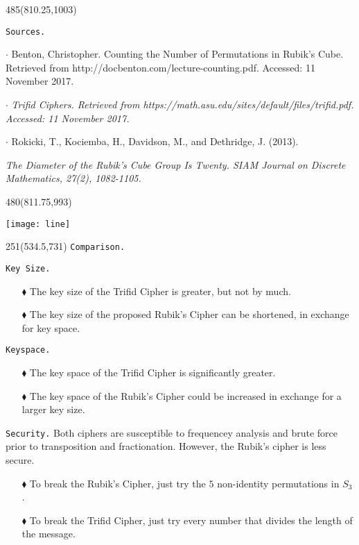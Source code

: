 \documentclass{beamer}%
\begin{document}
	\begin{textblock}{485}(810.25,1003)
		\begin{block}{\texttt{Sources.}}
			\begin{itemize}
			\tiny{	\item $\cdot$ Benton, Christopher. Counting the Number of Permutations in Rubik's Cube. Retrieved from http://docbenton.com/lecture-counting.pdf. Accessed: 11 November 2017.}
			\tiny{ \item $\cdot$	\it{\tiny{Trifid Ciphers.}}\tiny{ Retrieved from https://math.asu.edu/sites/default/files/trifid.pdf. Accessed: 11 November 2017.}}
			\tiny{	\item $\cdot$ Rokicki, T., Kociemba, H., Davidson, M., and Dethridge, J. (2013). }\it{\tiny{The Diameter of the Rubik's Cube Group Is Twenty.}} \tiny{SIAM Journal on Discrete Mathematics, 27(2), 1082-1105.}
			\end{itemize}
		\end{block}
	\end{textblock}
	\begin{textblock}{480}(811.75,993)
		\begin{center}
			\texttt{[image: line]}
		\end{center}
	\end{textblock}
\begin{textblock}{251}(534.5,731)
		{\centering \Large\huge\texttt{Comparison.}}
	
	\begin{block}{\texttt{Key Size.}}
		\begin{itemize}
			\item [$\blacklozenge$] The key size of the Trifid Cipher is greater, but not by much.
			\item [$\blacklozenge$]	The key size of the proposed Rubik's Cipher can be shortened, in exchange for key space.
		\end{itemize}
	\end{block}
	\begin{block}{\texttt{Keyspace.}}
	\begin{itemize}
	\item [$\blacklozenge$] The key space of the Trifid Cipher is significantly greater.
	\item [$\blacklozenge$] The key space of the Rubik's Cipher could be increased in exchange for a larger key size.
	\end{itemize}
	\end{block}
	\begin{block}{\texttt{Security.}}
		Both ciphers are susceptible to frequencey analysis and brute force prior to transposition and fractionation. However, the Rubik's cipher is less secure.
	\begin{itemize}
		\item [$\blacklozenge$] To break the Rubik's Cipher, just try the $5$ non-identity permutations in $S_{3}$.
		\item [$\blacklozenge$] To break the Trifid Cipher, just try every number that divides the length of the message.
	\end{itemize}
	\end{block}
	
\end{textblock}
\end{document}
